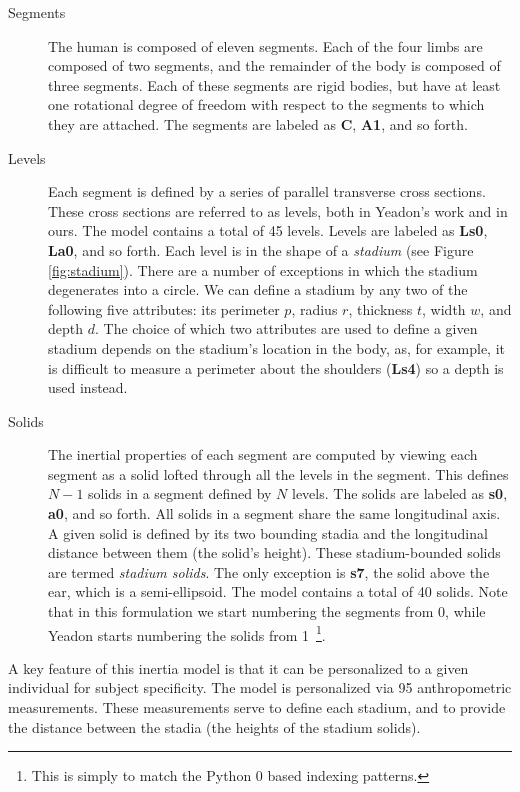 \documentclass[10pt]{article}
\begin{document}
\begin{description}
  \item[Segments]
    The human is composed of eleven segments. Each of the four limbs are
    composed of two segments, and the remainder of the body is composed of
    three segments. Each of these segments are rigid bodies, but have at least
    one rotational degree of freedom with respect to the segments to which they
    are attached. The segments are labeled as \textbf{C}, \textbf{A1}, and so
    forth.
  \item[Levels]
    Each segment is defined by a series of parallel transverse cross sections.
    These cross sections are referred to as levels, both in Yeadon's work and
    in ours. The model contains a total of 45 levels. Levels are labeled as
    \textbf{Ls0}, \textbf{La0}, and so forth. Each level is in the shape of a
    \emph{stadium} (see Figure \ref{fig:stadium}). There are a number of
    exceptions in which the stadium degenerates into a circle. We can define a
    stadium by any two of the following five attributes: its perimeter $p$,
    radius $r$, thickness $t$, width $w$, and depth $d$. The choice of which
    two attributes are used to define a given stadium depends on the stadium's
    location in the body, as, for example, it is difficult to measure a
    perimeter about the shoulders (\textbf{Ls4}) so a depth is used instead.
  \item[Solids]
    The inertial properties of each segment are computed by viewing each
    segment as a solid lofted through all the levels in the segment. This
    defines $N-1$ solids in a segment defined by $N$ levels. The solids are
    labeled as \textbf{s0}, \textbf{a0}, and so forth. All solids in a segment
    share the same longitudinal axis. A given solid is defined by its two
    bounding stadia and the longitudinal distance between them (the solid's
    height). These stadium-bounded solids are termed \emph{stadium solids}. The
    only exception is \textbf{s7}, the solid above the ear, which is a
    semi-ellipsoid. The model contains a total of 40 solids. Note that in this
    formulation we start numbering the segments from 0, while Yeadon starts
    numbering the solids from 1~\footnote{This is simply to match the Python 0
    based indexing patterns.}.
\end{description}

A key feature of this inertia model is that it can be personalized to a given
individual for subject specificity. The model is personalized via 95
anthropometric measurements. These measurements serve to define each stadium,
and to provide the distance between the stadia (the heights of the stadium
solids).
\end{document}
